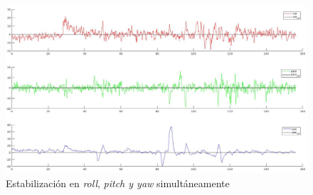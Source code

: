 \begin{figure}[htb!]
	\centering
	\includegraphics[width=0.9\textheight,angle=90]{experimentos/3_in_one_matlab}
	\vspace{0.5cm}
	\caption{Estabilización en \textit{roll}, \textit{pitch y \textit{yaw}} simultáneamente}
	\label{tl_p1r}	
\end{figure} 
%
